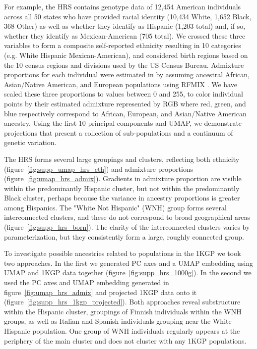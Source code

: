 \documentclass[12pt]{pnas-new}
\begin{document}
For example, the HRS contains genotype data of 12,454 American individuals across all 50 states who have provided racial identity (10,434 White, 1,652 Black, 368 Other) as well as whether they identify as Hispanic (1,203 total) and, if so, whether they identify as Mexican-American (705 total)\cite{juster1995overview}. We crossed these three variables to form a composite self-reported ethnicity resulting in 10 categories (e.g. White Hispanic Mexican-American), and considered birth regions based on the 10 census regions and divisions used by the US Census Bureau. Admixture proportions for each individual were estimated in \cite{baharian2016great} by assuming ancestral African, Asian/Native American, and European populations using RFMIX \cite{Maples:2013fia}.
We have scaled these three proportions to values between 0 and 255, to color individual points by their estimated admixture represented by RGB where red, green, and blue respectively correspond to African, European, and Asian/Native American ancestry. Using the first 10 principal components and UMAP, we demonstrate projections that present a collection of sub-populations and a continuum of genetic variation.

The HRS forms several large groupings and clusters, reflecting both ethnicity (figure~\ref{fig:supp_umap_hrs_eth}) and admixture proportions (figure~\ref{fig:umap_hrs_admix}). Gradients in admixture proportion are visible within the predominantly Hispanic cluster, but not within the predominantly Black cluster, perhaps because the variance in ancestry proportions is greater among Hispanics. The "White Not Hispanic" (WNH) group forms several interconnected clusters, and these do not correspond to broad geographical areas (figure~\ref{fig:supp_hrs_born}). The clarity of the interconnected clusters varies by parameterization, but they consistently form a large, roughly connected group.

To investigate possible ancestries related to populations in the 1KGP we took two approaches. In the first we generated PC axes and a UMAP embedding using UMAP and 1KGP data together (figure~\ref{fig:supp_hrs_1000g}). In the second we used the PC axes and UMAP embedding generated in figure~\ref{fig:umap_hrs_admix} and projected 1KGP data onto it (figure~\ref{fig:supp_hrs_1kgp_projected}). Both approaches reveal substructure within the Hispanic cluster, groupings of Finnish individuals within the WNH groups, as well as Italian and Spanish individuals grouping near the White Hispanic population. One group of WNH individuals regularly appears at the periphery of the main cluster and does not cluster with any 1KGP populations.
\end{document}
